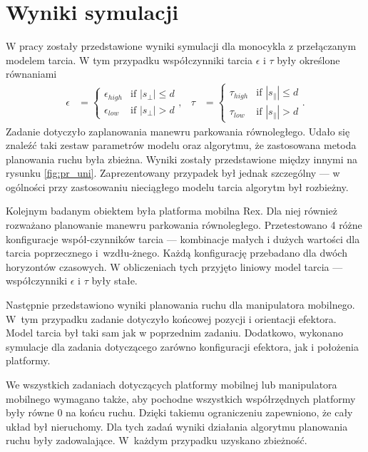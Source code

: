 \section{Wyniki symulacji}
W pracy zostały przedstawione wyniki symulacji dla monocykla z przełączanym modelem tarcia. W tym przypadku współczynniki tarcia $\epsilon$ i $\tau$ były określone równaniami
\begin{equation*}
\begin{aligned}
\epsilon&=\begin{cases}
\epsilon_{high} &\mbox{if } |s_\perp| \leq d \\
\epsilon_{low} &\mbox{if } |s_\perp| > d
\end{cases}, &
\tau&=\begin{cases}
\tau_{high} &\mbox{if } |s_\parallel| \leq d \\
\tau_{low} &\mbox{if } |s_\parallel| > d
\end{cases}.
\end{aligned}
\end{equation*}
Zadanie dotyczyło zaplanowania manewru parkowania równoległego.
Udało się znaleźć taki zestaw parametrów modelu oraz algorytmu, że zastosowana metoda planowania ruchu była zbieżna. Wyniki zostały przedstawione między innymi na rysunku \ref{fig:pr_uni}. Zaprezentowany przypadek był jednak szczególny --- w ogólności przy zastosowaniu nieciągłego modelu tarcia algorytm był rozbieżny.

Kolejnym badanym obiektem była platforma mobilna Rex. Dla niej również rozważano planowanie manewru parkowania równoległego. Przetestowano 4 różne konfiguracje współ-czynników tarcia --- kombinacje małych i dużych wartości dla tarcia poprzecznego i~wzdłu-żnego. Każdą konfigurację przebadano dla dwóch horyzontów czasowych. W obliczeniach tych przyjęto liniowy model tarcia --- współczynniki $\epsilon$ i $\tau$ były stałe. 

Następnie przedstawiono wyniki planowania ruchu dla manipulatora mobilnego. W~tym przypadku zadanie dotyczyło końcowej pozycji i orientacji efektora. Model tarcia był taki sam jak w poprzednim zadaniu. Dodatkowo, wykonano symulacje dla zadania dotyczącego zarówno konfiguracji efektora, jak i położenia platformy.

We wszystkich zadaniach dotyczących platformy mobilnej lub manipulatora mobilnego wymagano także, aby pochodne wszystkich współrzędnych platformy były równe 0 na końcu ruchu. Dzięki takiemu ograniczeniu zapewniono, że cały układ był nieruchomy. Dla tych zadań wyniki działania algorytmu planowania ruchu były zadowalające. W~każdym przypadku uzyskano zbieżność. 

